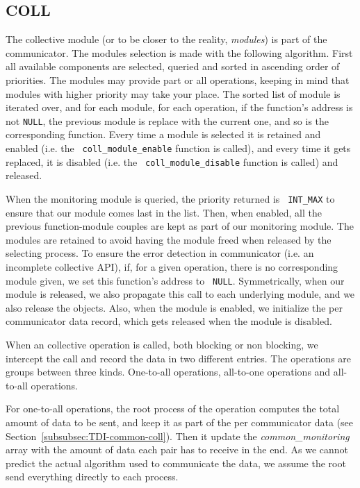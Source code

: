 \documentclass[notitlepage]{article}
\newcommand{\brkunds}[0]{\allowbreak\_}
\begin{document}
\subsection{COLL}
\label{subsec:TDI-coll}

The collective module (or to be closer to the reality, {\it modules})
is part of the communicator. The modules selection is made with the
following algorithm. First all available components are selected,
queried and sorted in ascending order of priorities. The modules may
provide part or all operations, keeping in mind that modules with
higher priority may take your place. The sorted list of module is
iterated over, and for each module, for each operation, if the
function's address is not {\tt NULL}, the previous module is replace
with the current one, and so is the corresponding function. Every time
a module is selected it is retained and enabled (i.e. the {\tt
  coll\brkunds{}module\brkunds{}enable} function is called), and every
time it gets replaced, it is disabled (i.e. the {\tt
  coll\brkunds{}module\brkunds{}disable} function is called) and
released.

When the monitoring module is queried, the priority returned is {\tt
  INT\brkunds{}MAX} to ensure that our module comes last in the
list. Then, when enabled, all the previous function-module couples are
kept as part of our monitoring module. The modules are retained to
avoid having the module freed when released by the selecting
process. To ensure the error detection in communicator (i.e. an
incomplete collective API), if, for a given operation, there is no
corresponding module given, we set this function's address to {\tt
  NULL}. Symmetrically, when our module is released, we also propagate
this call to each underlying module, and we also release the
objects. Also, when the module is enabled, we initialize the per
communicator data record, which gets released when the module is
disabled.

When an collective operation is called, both blocking or non blocking,
we intercept the call and record the data in two different
entries. The operations are groups between three kinds. One-to-all
operations, all-to-one operations and all-to-all operations.

For one-to-all operations, the root process of the operation computes
the total amount of data to be sent, and keep it as part of the per
communicator data (see Section~\ref{subsubsec:TDI-common-coll}). Then
it update the {\it common\brkunds{}monitoring} array with the amount
of data each pair has to receive in the end. As we cannot predict the
actual algorithm used to communicate the data, we assume the root send
everything directly to each process.
\end{document}
